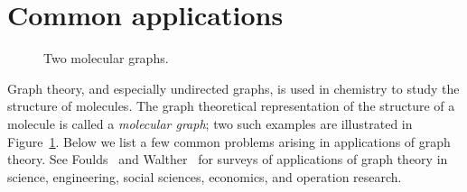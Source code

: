 \section{Common applications}
\label{sec:introduction:common_applications}

\begin{figure}[!htbp]
\centering
{}

\caption{Two molecular graphs.}
\label{fig:introduction:molecular_graphs}
\end{figure}

\noindent
Graph theory, and especially undirected graphs, is used in chemistry
to study the structure of molecules. The graph theoretical
representation of the structure of a molecule is called a
\emph{molecular graph}; two such examples are
illustrated in Figure~\ref{fig:introduction:molecular_graphs}. Below
we list a few common problems arising in applications of graph
theory. See Foulds~\cite{Foulds1992} and
Walther~\cite{Walther1984} for surveys of
applications of graph theory in science, engineering, social sciences,
economics, and operation research.

